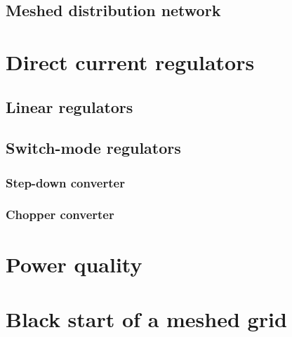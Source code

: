 \documentclass{report}
\begin{document}
\section{Meshed distribution network} 



\chapter{Direct current regulators}

\section{Linear regulators} 
\section{Switch-mode regulators} 
\subsection{Step-down converter} 
\subsection{Chopper converter} 

%

\chapter{Power quality}


\chapter{Black start of a meshed grid}

\end{document}
